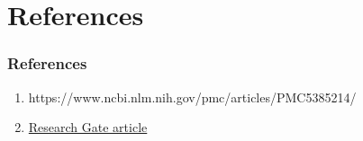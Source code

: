 \documentclass[11pt,]{beamer}
\begin{document}
\section{References}

\begin{frame}

	\frametitle{References}
	
	\begin{enumerate}
	    \item{https://www.ncbi.nlm.nih.gov/pmc/articles/PMC5385214/}
	    \item{\href{https://www.researchgate.net/publication/261159147_Impacts_of_sports_on_students'_life}{Research Gate article}}
	\end{enumerate}
	
\end{frame}
\end{document}
